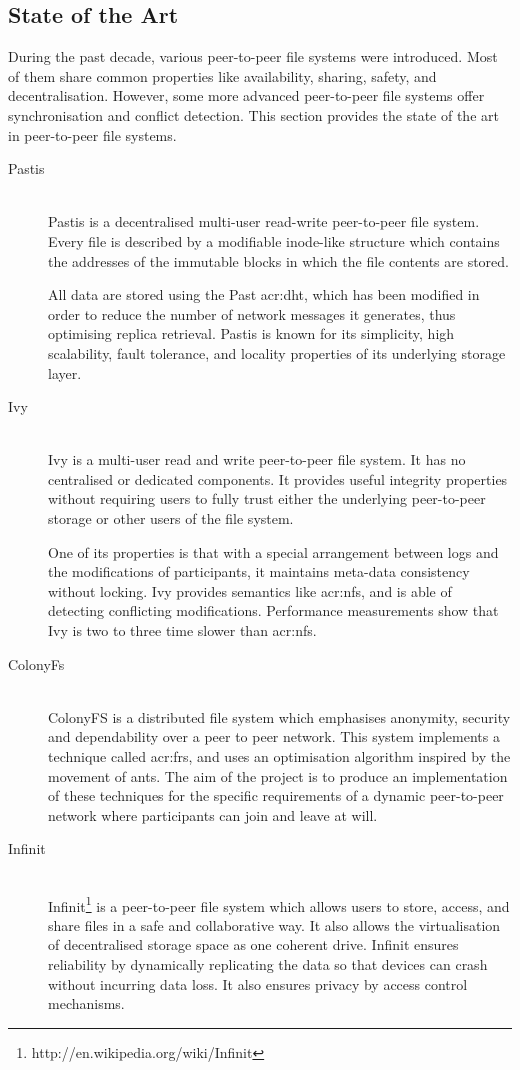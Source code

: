 \subsection{State of the Art}

During the past decade, various peer-to-peer file systems were introduced. Most of them share common properties like availability, sharing, safety, and decentralisation. However, some more advanced peer-to-peer file systems offer synchronisation and conflict detection. This section provides the state of the art in peer-to-peer file systems.

\begin{description}
	\item[Pastis]\-\\
	Pastis \cite{Busca:2005gt} is a decentralised multi-user read-write peer-to-peer file system. Every file is described by
a modifiable inode-like structure which contains the addresses of the immutable blocks in which the file contents are stored.

All data are stored using the Past \gls{acr:dht}, which has been modified in order to reduce the number of network messages it generates, thus optimising replica retrieval. Pastis is known for its simplicity, high scalability, fault tolerance, and locality properties of its underlying storage layer.
	\item[Ivy]\-\\
	Ivy \cite{Muthitacharoen:2002iv} is a multi-user read and write peer-to-peer file system. It has no centralised or dedicated components. It provides useful integrity properties without requiring users to fully trust either the underlying peer-to-peer storage or other users of the file system.
	
	One of its properties is that with a special arrangement between logs and the modifications of participants, it maintains meta-data consistency without locking. Ivy provides semantics like \gls{acr:nfs}, and is able of detecting conflicting modifications. Performance measurements show that Ivy is two to three time slower than \gls{acr:nfs}.
	\item[ColonyFs]\-\\
	ColonyFS \cite{Colony:2009fs} is a distributed file system which emphasises anonymity, security and dependability over a peer to peer network. This system implements a technique called \gls{acr:frs}, and uses an optimisation algorithm inspired by the movement of ants. The aim of the project is to produce an implementation of these techniques for the specific requirements of a dynamic peer-to-peer network where participants can join and leave at will.
	\item[Infinit]\-\\
	Infinit\footnote{http://en.wikipedia.org/wiki/Infinit} is a peer-to-peer file system which allows users to store, access, and share files in a safe and collaborative way. It also allows the virtualisation of decentralised storage space as one coherent drive. Infinit ensures reliability by dynamically replicating the data so that devices can crash without incurring data loss. It also ensures privacy by access control mechanisms.
	

\end{description}
